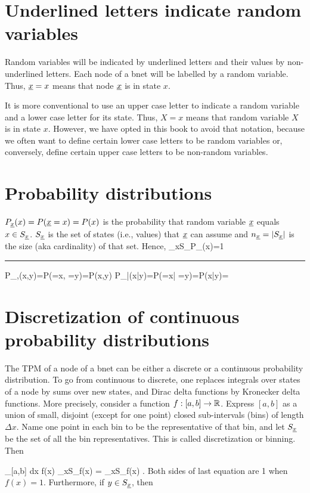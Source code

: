 \section{Underlined letters
 indicate random variables}
Random variables will be indicated by 
underlined letters and their values 
by non-underlined letters.
 Each node of a bnet will be
 labelled by a random variable.
 Thus, ${\underline{x}}=x$ means that node 
${\underline{x}}$ is in state $x$.

It is more
conventional to
use an upper
case letter to 
indicate
a random 
variable
and a lower case letter
for its state.
Thus, $X=x$ means that 
random variable
$X$ is in state $x$.
However,
we have
opted
in this
book to
avoid
that notation,
because
we often
want to define
certain lower
case letters 
to be random variables
or, conversely, define certain upper
case letters to 
be non-random variables.

\section{Probability distributions}
 $P_{\underline{x}}(x)=P({\underline{x}}=x)=P(x)$ is the probability that random variable ${\underline{x}}$ equals $x\in S_{\underline{x}}$. $S_{\underline{x}}$ is the set of states (i.e., values) that ${\underline{x}}$ can assume and $n_{\underline{x}} = |S_{\underline{x}}|$ is the size (aka cardinality) of that set. Hence, 
\beq
\sum_{x\in S_\rvx}P_\rvx(x)=1
\eeq

\hrule
\beq
P_{\rvx,\rvy}(x,y)=P(\rvx=x, \rvy=y)=P(x,y)
\eeq
\beq
P_{\rvx|\rvy}(x|y)=P(\rvx=x| \rvy=y)=P(x|y)=
\eeq



\section{Discretization
of continuous
probability distributions}

The TPM of a node 
of a bnet can be either a discrete or 
a continuous probability distribution. 
To go from continuous to discrete, one 
replaces integrals over states of a node
 by sums over new states, and Dirac delta 
functions by Kronecker delta functions.
 More precisely, consider a function 
$f: [a, b]\rightarrow { \mathbb{R}}$. Express
 $[a,b]$ as 
a union of
small, disjoint (except for
one point) closed sub-intervals (bins) of
length $\Delta x$.
Name one point
in each bin to be the representative of that bin,
and  let $S_{\underline{x}}$ be the
set of all the bin representatives. This is called 
discretization or binning. Then

\beq 
{}
\int_{[a,b]} dx \; f(x)\rarrow
{} \sum_{x\in S_\rvx}f(x)
=
 \sum_{x\in S_\rvx}f(x)
 \;.
\eeq
Both sides of last equation are 1 when $f(x)=1$.
 Furthermore, if $y\in S_{\underline{x}}$, then

